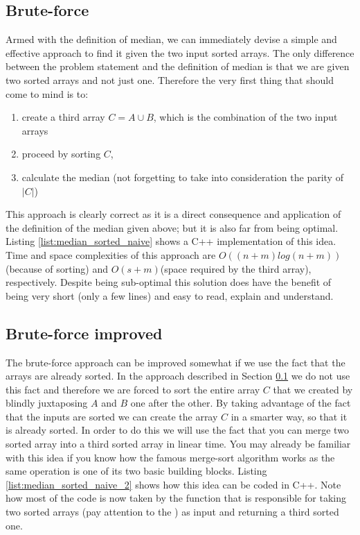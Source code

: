 \subsection{Brute-force}
\label{median_sorted_arrays:sec:bruteforce}
Armed with the definition of median, we can immediately devise a simple and effective approach to
find it given the two input sorted arrays. The only difference between the problem statement and the
definition of median is that we are given two sorted arrays and not just one. Therefore the very first thing that should come to mind is to:
\begin{enumerate}
	\item create a third array $C = A \cup B$, which is the combination of the two input arrays
	\item proceed by sorting $C$,
	\item calculate the median (not forgetting to take into consideration the parity of $|C|$)
\end{enumerate}

This approach is clearly correct as it is a direct consequence and application of the
definition of the median given above; but it is also far from being optimal. Listing
\ref{list:median_sorted_naive} shows a C++ implementation of this idea. Time and space complexities
of this approach are $O((n+m)log(n+m))$(because of sorting) and $O(s+m)$(space required by the third
array), respectively. Despite being sub-optimal this solution does have the benefit of being very short (only a few lines)
and easy to read, explain and understand.




\subsection{Brute-force improved}
\label{median_sorted_arrays:sec:bruteforce_improved}
The brute-force approach can be improved somewhat if we use the fact that the arrays are already
sorted. In the approach described in Section \ref{median_sorted_arrays:sec:bruteforce} we do not use
this fact and therefore we are forced to sort the entire array $C$ that we created by blindly juxtaposing $A$ and $B$ one after the other.
By taking advantage of the fact that the inputs are sorted we can create the array $C$ in a smarter way,
so that it is already sorted. In order to do this we will use the fact that you can merge two sorted array into a third sorted array in linear time.
You may already be familiar with this idea if you know how the famous merge-sort algorithm\cite{wiki:mergesort} works as the same operation is one of its two basic building blocks.
Listing \ref{list:median_sorted_naive_2} shows how this idea can be coded in C++. Note how most of the code is now taken by the  function that 
is responsible for taking two sorted arrays (pay attention to the ) as input and returning a third sorted one. 

